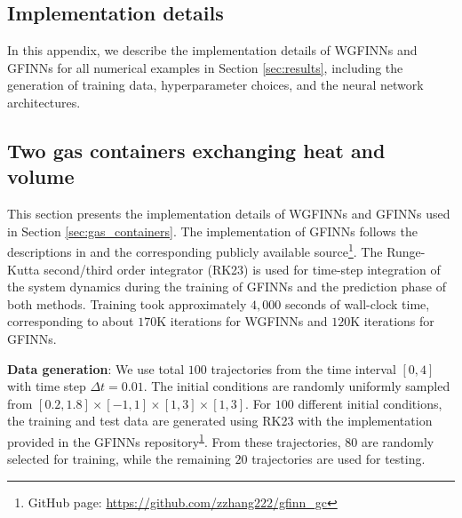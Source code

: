 \documentclass[final]{siamltex}
\begin{document}
\begin{appendices}
\section{Implementation details}
\label{appendix:training_details}
In this appendix, we describe the implementation details of WGFINNs and GFINNs for all numerical examples in Section \ref{sec:results}, including the generation of training data, hyperparameter choices, and the neural network architectures.

\subsection{Two gas containers exchanging heat and volume}
\label{sec:app_GC}
This section presents the implementation details of WGFINNs and GFINNs used in Section \ref{sec:gas_containers}. The implementation of GFINNs follows the descriptions in \cite{zhang2022gfinns} and the corresponding publicly available source\footnote{\label{ft:gfinns}GitHub page: \url{https://github.com/zzhang222/gfinn_gc}}. 
The Runge-Kutta second/third order integrator (RK23) is used for time-step integration of the system dynamics during the training of GFINNs and the prediction phase of both methods.
Training took approximately \(4{,}000\) seconds of wall-clock time, corresponding to about \(170\text{K}\) iterations for WGFINNs and \(120\text{K}\) iterations for GFINNs. 

{\bf Data generation}: 
We use total $100$ trajectories from the time interval $[0,4]$ with time step $\Delta t = 0.01$. The initial conditions are randomly uniformly sampled from $[0.2,1.8]\times[-1,1]\times[1,3]\times[1,3]$.
For $100$ different initial conditions, the training and test data are generated using RK23 with the implementation provided in the GFINNs repository\textsuperscript{\ref{ft:gfinns}}. From these trajectories, $80$ are randomly selected for training, while the remaining $20$ trajectories are used for testing.


\end{appendices}
\end{document}
